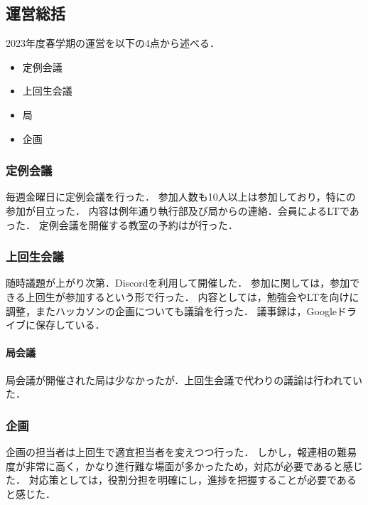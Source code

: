 \subsection*{運営総括}


2023年度春学期の運営を以下の4点から述べる．
\begin{itemize}
    \item 定例会議
    \item 上回生会議
    \item 局
    \item 企画
\end{itemize}

\subsubsection*{定例会議}
毎週金曜日に定例会議を行った．
参加人数も10人以上は参加しており，特に\firstGrade{}の参加が目立った．
内容は例年通り執行部及び局からの連絡．会員によるLTであった．
定例会議を開催する教室の予約は\kensuiChief{}が行った．

\subsubsection*{上回生会議}
随時議題が上がり次第．Discordを利用して開催した．
参加に関しては，参加できる上回生が参加するという形で行った．
内容としては，勉強会やLTを\firstGrade{}向けに調整，またハッカソンの企画についても議論を行った．
議事録は，Googleドライブに保存している．

\paragraph*{局会議}
局会議が開催された局は少なかったが．上回生会議で代わりの議論は行われていた．

\subsubsection*{企画}
企画の担当者は上回生で適宜担当者を変えつつ行った．
しかし，報連相の難易度が非常に高く，かなり進行難な場面が多かったため，対応が必要であると感じた．
対応策としては，役割分担を明確にし，進捗を把握することが必要であると感じた．
